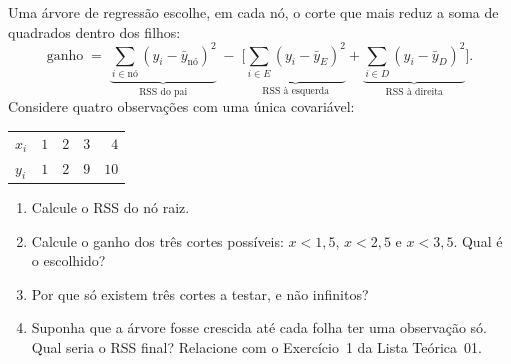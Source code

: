 \documentclass[11pt,a4paper]{article}
\begin{document}
\begin{exercicio}
Uma árvore de regressão escolhe, em cada nó, o corte que mais reduz a soma de
quadrados dentro dos filhos:
\[
  \text{ganho} \;=\;
  \underbrace{\sum_{i\in\text{nó}}(y_i-\bar y_{\text{nó}})^2}_{\text{RSS do pai}}
  \;-\;
  \Big[\underbrace{\sum_{i\in E}(y_i-\bar y_E)^2}_{\text{RSS à esquerda}}
     + \underbrace{\sum_{i\in D}(y_i-\bar y_D)^2}_{\text{RSS à direita}}\Big].
\]
Considere quatro observações com uma única covariável:
\begin{center}\small
\begin{tabular}{@{}lrrrr@{}}
\toprule
$x_i$ & $1$ & $2$ & $3$ & $4$ \\
$y_i$ & $1$ & $2$ & $9$ & $10$ \\
\bottomrule
\end{tabular}
\end{center}
\begin{enumerate}[label=(\alph*),leftmargin=1.1cm]
  \item Calcule o RSS do nó raiz.
  \item Calcule o ganho dos três cortes possíveis: $x<1{,}5$, $x<2{,}5$ e
        $x<3{,}5$. Qual é o escolhido?
  \item Por que só existem três cortes a testar, e não infinitos?
  \item Suponha que a árvore fosse crescida até cada folha ter uma observação só.
        Qual seria o RSS final? Relacione com o Exercício~1 da Lista Teórica~01.
\end{enumerate}
\end{exercicio}
\end{document}
